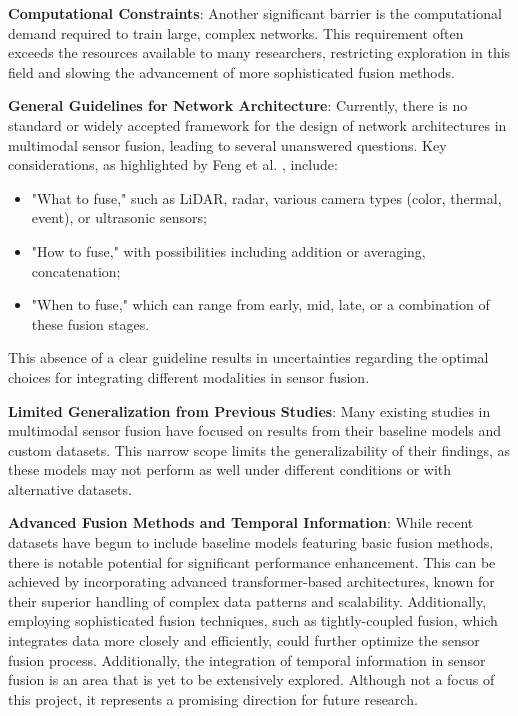 \documentclass[report.tex]{subfiles}
\begin{document}
        \textbf{Computational Constraints}: Another significant barrier is the computational demand required to train large, complex networks. This requirement often exceeds the resources available to many researchers, restricting exploration in this field and slowing the advancement of more sophisticated fusion methods.

        \textbf{General Guidelines for Network Architecture}: Currently, there is no standard or widely accepted framework for the design of network architectures in multimodal sensor fusion, leading to several unanswered questions. Key considerations, as highlighted by Feng et al. \cite{feng2020deep}, include:
        \begin{itemize}
            \item "What to fuse," such as LiDAR, radar, various camera types (color, thermal, event), or ultrasonic sensors;
            \item "How to fuse," with possibilities including addition or averaging, concatenation;
            \item "When to fuse," which can range from early, mid, late, or a combination of these fusion stages.
        \end{itemize}
        This absence of a clear guideline results in uncertainties regarding the optimal choices for integrating different modalities in sensor fusion.

        \textbf{Limited Generalization from Previous Studies}: Many existing studies in multimodal sensor fusion have focused on results from their baseline models and custom datasets. This narrow scope limits the generalizability of their findings, as these models may not perform as well under different conditions or with alternative datasets.

        \textbf{Advanced Fusion Methods and Temporal Information}: While recent datasets have begun to include baseline models featuring basic fusion methods, there is notable potential for significant performance enhancement. This can be achieved by incorporating advanced transformer-based architectures, known for their superior handling of complex data patterns and scalability. Additionally, employing sophisticated fusion techniques, such as tightly-coupled fusion, which integrates data more closely and efficiently, could further optimize the sensor fusion process. Additionally, the integration of temporal information in sensor fusion is an area that is yet to be extensively explored. Although not a focus of this project, it represents a promising direction for future research.
\end{document}
